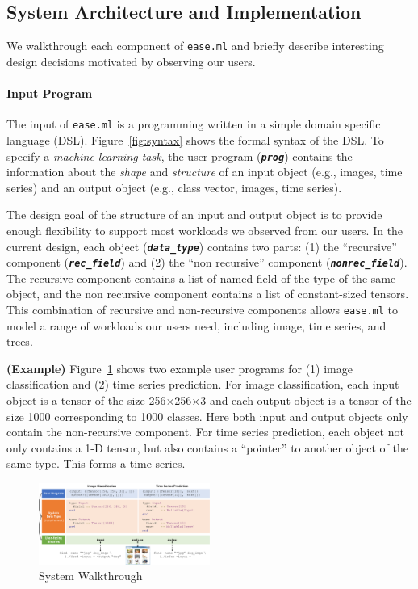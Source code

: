 \documentclass[letterpaper]{vldb}
\newcommand{\eml}{\texttt{ease.ml}\xspace}
\begin{document}
\vspace{-0.5em}
\subsection{System Architecture and Implementation}

We walkthrough each component of \eml and briefly
describe interesting design decisions
motivated by observing our users. 

\vspace{-1em}
\paragraph*{Input Program} The input
of \eml is a programming written in 
a simple domain specific language (DSL). Figure~\ref{fig:syntax}
shows the formal syntax of the DSL. To specify
a {\em machine learning task}, the user program (\textbf{\texttt{\em prog}})
contains the information about the {\em shape}
and {\em structure} of an input object (e.g., images, time series)
and an output object (e.g., class vector, images, time series).

The design goal of the structure of an input and output
object is to provide enough flexibility to support most
workloads we observed from our users. In the current design,
each object (\textbf{\texttt{\em data\_type}}) contains two parts:
(1) the ``recursive'' component (\textbf{\texttt{\em rec\_field}})
and (2) the ``non recursive'' component (\textbf{\texttt{\em nonrec\_field}}).
The recursive component contains a list of named 
field of the type of the same object, and the non recursive
component contains a list of constant-sized tensors.
This combination of recursive and non-recursive
components allows \eml to model a range of workloads
our users need, including image, time series, and trees.

\vspace{0.5em}
\noindent
{\bf (Example)} Figure~\ref{fig:walkthrough} shows
two example user programs for (1) image classification and (2) time series
prediction. For image classification, each input
object is a tensor of the size 256$\times$256$\times$3 and
each output object is a tensor of the size 1000 corresponding
to 1000 classes. Here both input
and output objects only contain the non-recursive component.
For time series prediction, each object not only
contains a 1-D tensor, but also contains
a ``pointer'' to another object of the same type. This
forms a time series. 


\begin{figure}[t]
\centering
\includegraphics[width=0.5\textwidth]{figures/arch}
\vspace{-2em}
\caption{System Walkthrough}
\vspace{-2em}
\label{fig:walkthrough}
\end{figure}
\end{document}
